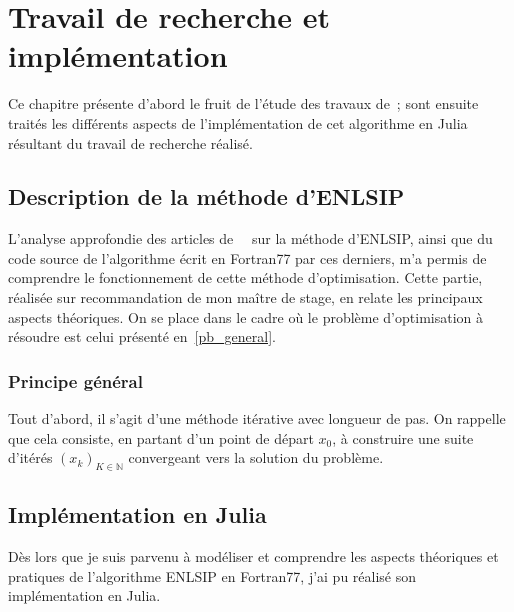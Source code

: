 \chapter{Travail de recherche et implémentation}\label{Travail}


Ce chapitre présente d'abord le fruit de l'étude des travaux de~\citet{lindwedin88}; sont ensuite traités les différents 
aspects de l'implémentation de cet algorithme en Julia résultant du travail de recherche réalisé.

\section{Description de la méthode d'ENLSIP}\label{description_methode}

L'analyse approfondie des articles de~\citet{lindwedin88}~\cite{lindstromwedin1984} sur la méthode d'ENLSIP, ainsi que du code source de l'algorithme écrit en Fortran77 
par ces derniers, m'a permis de comprendre le fonctionnement de cette méthode d'optimisation. Cette partie, réalisée sur recommandation de mon maître de stage, 
en relate les principaux aspects théoriques. 
On se place dans le cadre où le problème d'optimisation à résoudre est celui présenté en~\eqref{pb_general}.

\subsection{Principe général}

Tout d'abord, il s'agit d'une méthode itérative avec longueur de pas. On rappelle que cela consiste, en partant d'un point de départ $x_0$, à construire une suite
d'itérés $(x_k)_{K\in \mathbb{N}}$ convergeant vers la solution du problème.

\section{Implémentation en Julia}

Dès lors que je suis parvenu à modéliser et comprendre les aspects théoriques et pratiques de l'algorithme ENLSIP en Fortran77, j'ai pu réalisé son implémentation en Julia.